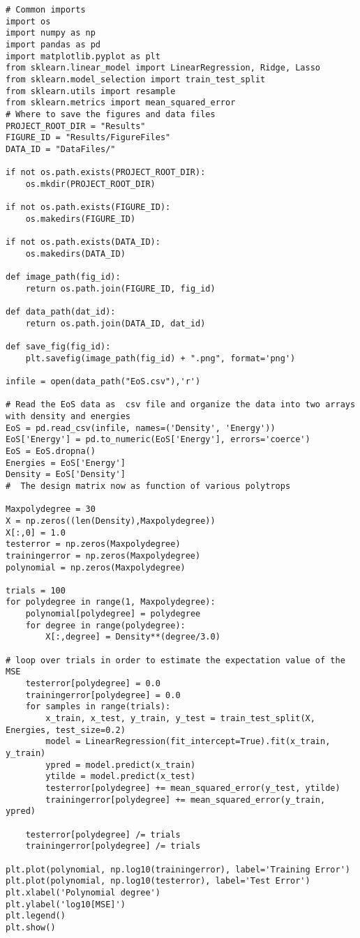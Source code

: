 \documentclass[%
oneside,                 %
final,                   %
10pt]{article}
\begin{document}
\begin{verbatim}
# Common imports
import os
import numpy as np
import pandas as pd
import matplotlib.pyplot as plt
from sklearn.linear_model import LinearRegression, Ridge, Lasso
from sklearn.model_selection import train_test_split
from sklearn.utils import resample
from sklearn.metrics import mean_squared_error
# Where to save the figures and data files
PROJECT_ROOT_DIR = "Results"
FIGURE_ID = "Results/FigureFiles"
DATA_ID = "DataFiles/"

if not os.path.exists(PROJECT_ROOT_DIR):
    os.mkdir(PROJECT_ROOT_DIR)

if not os.path.exists(FIGURE_ID):
    os.makedirs(FIGURE_ID)

if not os.path.exists(DATA_ID):
    os.makedirs(DATA_ID)

def image_path(fig_id):
    return os.path.join(FIGURE_ID, fig_id)

def data_path(dat_id):
    return os.path.join(DATA_ID, dat_id)

def save_fig(fig_id):
    plt.savefig(image_path(fig_id) + ".png", format='png')

infile = open(data_path("EoS.csv"),'r')

# Read the EoS data as  csv file and organize the data into two arrays with density and energies
EoS = pd.read_csv(infile, names=('Density', 'Energy'))
EoS['Energy'] = pd.to_numeric(EoS['Energy'], errors='coerce')
EoS = EoS.dropna()
Energies = EoS['Energy']
Density = EoS['Density']
#  The design matrix now as function of various polytrops

Maxpolydegree = 30
X = np.zeros((len(Density),Maxpolydegree))
X[:,0] = 1.0
testerror = np.zeros(Maxpolydegree)
trainingerror = np.zeros(Maxpolydegree)
polynomial = np.zeros(Maxpolydegree)

trials = 100
for polydegree in range(1, Maxpolydegree):
    polynomial[polydegree] = polydegree
    for degree in range(polydegree):
        X[:,degree] = Density**(degree/3.0)

# loop over trials in order to estimate the expectation value of the MSE
    testerror[polydegree] = 0.0
    trainingerror[polydegree] = 0.0
    for samples in range(trials):
        x_train, x_test, y_train, y_test = train_test_split(X, Energies, test_size=0.2)
        model = LinearRegression(fit_intercept=True).fit(x_train, y_train)
        ypred = model.predict(x_train)
        ytilde = model.predict(x_test)
        testerror[polydegree] += mean_squared_error(y_test, ytilde)
        trainingerror[polydegree] += mean_squared_error(y_train, ypred) 

    testerror[polydegree] /= trials
    trainingerror[polydegree] /= trials

plt.plot(polynomial, np.log10(trainingerror), label='Training Error')
plt.plot(polynomial, np.log10(testerror), label='Test Error')
plt.xlabel('Polynomial degree')
plt.ylabel('log10[MSE]')
plt.legend()
plt.show()

\end{verbatim}
\end{document}

